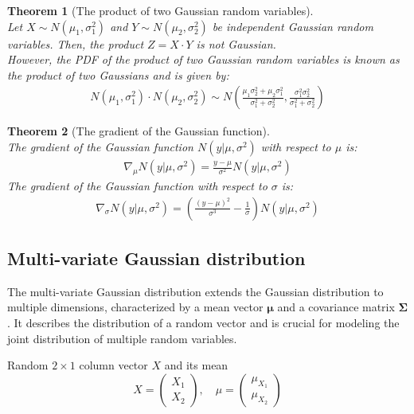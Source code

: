 \documentclass[11pt]{book} %
\newtheorem{theorem}{Theorem}[section]
\begin{document}
\begin{theorem}[The product of two Gaussian random variables]\ \\
    Let \(X \sim N(\mu_1, \sigma_1^2)\) and \(Y \sim N(\mu_2, \sigma_2^2)\) be independent Gaussian random variables. 
    Then, the product \(Z = X \cdot Y\) is not Gaussian. \\
    However, the PDF of the product of two Gaussian random variables is known as the \textit{product of two Gaussians} and is given by:
    \begin{align*}
        N\left( \mu_1, \sigma_1^2 \right) \cdot N\left( \mu_2, \sigma_2^2 \right) \sim
        N(\frac{\mu_1 \sigma_2^2 + \mu_2 \sigma_1^2}{\sigma_1^2 + \sigma_2^2}, \frac{\sigma_1^2 \sigma_2^2}{\sigma_1^2 + \sigma_2^2})
    \end{align*}
\end{theorem}

\begin{theorem}[The gradient of the Gaussian function]\ \\
    The gradient of the Gaussian function \(N(y | \mu, \sigma^2)\) with respect to \(\mu\) is:
    \begin{align*}
        \nabla_\mu N(y | \mu, \sigma^2) = \frac{y - \mu}{\sigma^2} N(y | \mu, \sigma^2)
    \end{align*}
    The gradient of the Gaussian function with respect to \(\sigma\) is:
    \begin{align*}
        \nabla_{\sigma} N(y | \mu, \sigma^2) = \left( \frac{(y - \mu)^2}{\sigma^3}  - \frac{1}{\sigma} \right) N(y | \mu, \sigma^2)
    \end{align*} 
    
\end{theorem}

\newpage

\subsection{Multi-variate Gaussian distribution}

The multi-variate Gaussian distribution extends the Gaussian distribution to multiple dimensions, 
characterized by a mean vector \(\boldsymbol{\mu}\) and a covariance matrix \(\boldsymbol{\Sigma}\). 
It describes the distribution of a random vector and is crucial for modeling the joint distribution of multiple random variables.


Random $2 \times 1$ column vector $X$ and its mean
\[
X = \begin{pmatrix}
X_1 \\
X_2
\end{pmatrix},
\quad
\mu = \begin{pmatrix}
\mu_{X_1} \\
\mu_{X_2}
\end{pmatrix}
\]
\end{document}
